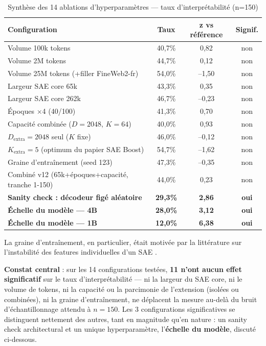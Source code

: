 \documentclass[11pt]{article}
\begin{document}
\begin{table}[h!]
\centering
\caption{Synthèse des 14 ablations d'hyperparamètres --- taux d'interprétabilité (n=150)}
\label{tab:synthese}
\vspace{0.4em}\small
\begin{tabular}{@{}lccc@{}}
\toprule
\textbf{Configuration} & \textbf{Taux} & \textbf{z vs référence} & \textbf{Signif.} \\ \midrule
Volume 100k tokens & 40,7\% & 0,82 & non \\
Volume 2M tokens & 44,7\% & 0,12 & non \\
Volume 25M tokens (+filler FineWeb2-fr) & 54,0\% & --1,50 & non \\
Largeur SAE core 65k & 43,3\% & 0,35 & non \\
Largeur SAE core 262k & 46,7\% & --0,23 & non \\
Époques $\times$4 (40/100) & 41,3\% & 0,70 & non \\
Capacité combinée ($D{=}2048$, $K{=}64$) & 40,0\% & 0,93 & non \\
$D_\text{extra}=2048$ seul ($K$ fixe) & 46,0\% & --0,12 & non \\
$K_\text{extra}=5$ (optimum du papier SAE Boost) & 54,7\% & --1,62 & non \\
Graine d'entraînement (seed 123) & 47,3\% & --0,35 & non \\
Combiné v12 (65k+époques+capacité, tranche 1-150) & 44,0\% & 0,23 & non \\
\textbf{Sanity check : décodeur figé aléatoire} & \textbf{29,3\%} & \textbf{2,86} & \textbf{oui} \\
\textbf{Échelle du modèle --- 4B} & \textbf{28,0\%} & \textbf{3,12} & \textbf{oui} \\
\textbf{Échelle du modèle --- 1B} & \textbf{12,0\%} & \textbf{6,38} & \textbf{oui} \\
\bottomrule
\end{tabular}
\end{table}

La graine d'entraînement, en particulier, était motivée par la littérature sur l'instabilité des features individuelles d'un SAE \cite{unstablefeatures2026, identifiablesae2026}.

\textbf{Constat central} : sur les 14 configurations testées, \textbf{11
n'ont aucun effet significatif} sur le taux d'interprétabilité --- ni la
largeur du SAE core, ni le volume de tokens, ni la capacité ou la parcimonie
de l'extension (isolées ou combinées), ni la graine d'entraînement, ne
déplacent la mesure au-delà du bruit d'échantillonnage attendu à $n=150$. Les
3 configurations significatives se distinguent nettement des autres, tant en
magnitude qu'en nature : un sanity check architectural et un unique
hyperparamètre, l'\textbf{échelle du modèle}, discuté ci-dessous.
\end{document}
